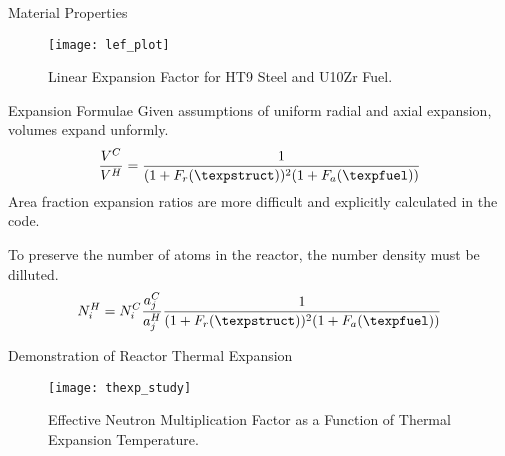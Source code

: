 \begin{frame}{Material Properties}
  \begin{figure}
    \centering
    \texttt{[image: lef\_plot]}
    \caption{Linear Expansion Factor for HT9 Steel and U10Zr Fuel.}
    \label{fig:lef_plot}
  \end{figure}
\end{frame}

\begin{frame}{Expansion Formulae}
  Given assumptions of uniform radial and axial expansion, volumes expand
  unformly.
  \begin{equation}
    \label{eq:volume_ratio}
    \frac{V^C}{V^H} = \frac{1}{(1+F_r(\texpstruct))^2 (1+F_a(\texpfuel))}
  \end{equation}
  Area fraction expansion ratios are more difficult and explicitly calculated in
  the code.

  To preserve the number of atoms in the reactor, the number density must be
  dilluted.
  \begin{equation}
    \label{eq:nden_thexp_update}
    N_i^H = N_i^C \frac{a_j^C}{a_j^H} 
      \frac{1}{(1+F_r(\texpstruct))^2 (1+F_a(\texpfuel))}
  \end{equation}
\end{frame}

\begin{frame}{Demonstration of Reactor Thermal Expansion}
  \begin{figure}
    \centering
    \texttt{[image: thexp\_study]}
    \caption{Effective Neutron Multiplication Factor as a Function of 
      Thermal Expansion Temperature.}
    \label{fig:thexp_study}
  \end{figure}
\end{frame}
